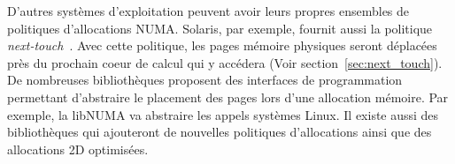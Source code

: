 D'autres systèmes d'exploitation peuvent avoir leurs propres ensembles de politiques d'allocations NUMA.
%
Solaris, par exemple, fournit aussi la politique {\em next-touch}~\cite{next_touch}.
%
Avec cette politique, les pages mémoire physiques seront déplacées près du prochain coeur de calcul qui y accédera (Voir section~\ref{sec:next_touch}).
%
De nombreuses bibliothèques proposent des interfaces de programmation permettant d'abstraire le placement des pages lors d'une allocation mémoire.
%
Par exemple, la libNUMA\cite{libnuma} va abstraire les appels systèmes Linux.
%
Il existe aussi des bibliothèques qui ajouteront de nouvelles politiques d'allocations ainsi que des allocations 2D optimisées\cite{minas}.
